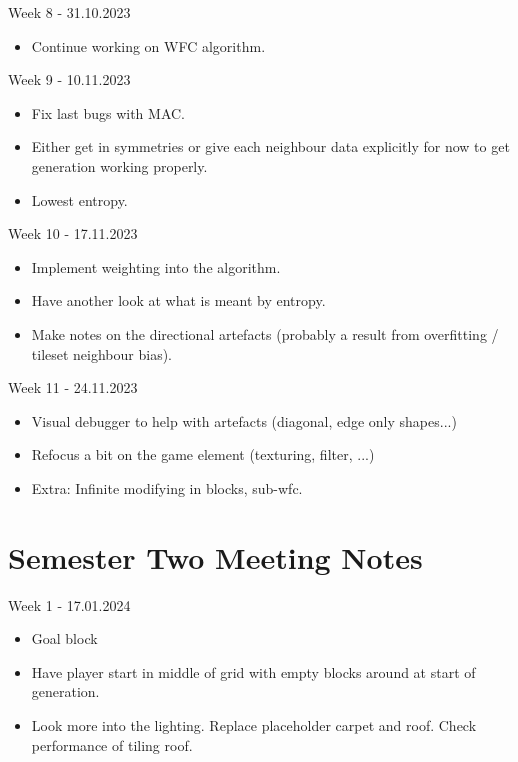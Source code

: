 \noindent Week 8 - 31.10.2023
\begin{itemize}
    \item Continue working on WFC algorithm.
\end{itemize}

\noindent Week 9 - 10.11.2023
\begin{itemize}
    \item Fix last bugs with MAC.
    \item Either get in symmetries or give each neighbour data explicitly for now to get generation working properly.
    \item Lowest entropy.
\end{itemize}

\noindent Week 10 - 17.11.2023
\begin{itemize}
    \item Implement weighting into the algorithm.
    \item Have another look at what is meant by entropy.
    \item Make notes on the directional artefacts (probably a result from overfitting / tileset neighbour bias).
\end{itemize}

\noindent Week 11 - 24.11.2023
\begin{itemize}
    \item Visual debugger to help with artefacts (diagonal, edge only shapes...)
    \item Refocus a bit on the game element (texturing, filter, ...)
    \item Extra: Infinite modifying in blocks, sub-wfc.
\end{itemize}

\section{Semester Two Meeting Notes}
\label{sec:semester_two_meeting_notes}
\noindent Week 1 - 17.01.2024
\begin{itemize}
    \item Goal block
    \item Have player start in middle of grid with empty blocks around at start of generation.
    \item Look more into the lighting. Replace placeholder carpet and roof. Check performance of tiling roof.
\end{itemize}

